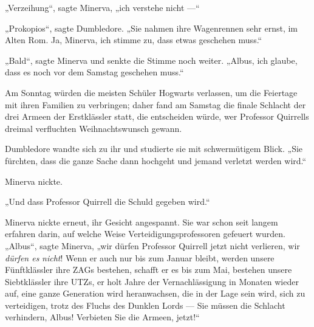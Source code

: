 „Verzeihung“, sagte Minerva, „ich verstehe nicht —“

„Prokopios“, sagte Dumbledore.
„Sie nahmen ihre Wagenrennen sehr ernst, im Alten Rom. Ja, Minerva, ich stimme zu, dass etwas geschehen muss.“

„Bald“, sagte Minerva und senkte die Stimme noch weiter.
„Albus, ich glaube, dass es noch vor dem Samstag geschehen muss.“

Am Sonntag würden die meisten Schüler Hogwarts verlassen, um die Feiertage mit ihren Familien zu verbringen; daher fand am Samstag die finale Schlacht der drei Armeen der Erstklässler statt, die entscheiden würde, wer Professor Quirrells dreimal verfluchten Weihnachtswunsch gewann.

Dumbledore wandte sich zu ihr und studierte sie mit schwermütigem Blick.
„Sie fürchten, dass die ganze Sache dann hochgeht und jemand verletzt werden wird.“

Minerva nickte.

„Und dass Professor Quirrell die Schuld gegeben wird.“

Minerva nickte erneut, ihr Gesicht angespannt. Sie war schon seit langem erfahren darin, auf welche Weise Verteidigungsprofessoren gefeuert wurden.
„Albus“, sagte Minerva, „wir dürfen Professor Quirrell jetzt nicht verlieren, wir \emph{dürfen es} \emph{nicht}! Wenn er auch nur bis zum Januar bleibt, werden unsere Fünftklässler ihre ZAGs bestehen, schafft er es bis zum Mai, bestehen unsere Siebtklässler ihre UTZs, er holt Jahre der Vernachlässigung in Monaten wieder auf, eine ganze Generation wird heranwachsen, die in der Lage sein wird, sich zu verteidigen, trotz des Fluchs des Dunklen Lords — Sie müssen die Schlacht verhindern, Albus! Verbieten Sie die Armeen, jetzt!“


